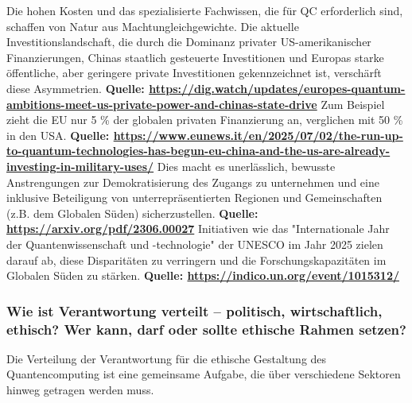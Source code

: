 Die hohen Kosten und das spezialisierte Fachwissen, die für QC erforderlich sind, schaffen von Natur aus Machtungleichgewichte. Die aktuelle Investitionslandschaft, die durch die Dominanz privater US-amerikanischer Finanzierungen, Chinas staatlich gesteuerte Investitionen und Europas starke öffentliche, aber geringere private Investitionen gekennzeichnet ist, verschärft diese Asymmetrien. \textbf{Quelle: \href{https://dig.watch/updates/europes-quantum-ambitions-meet-us-private-power-and-chinas-state-drive}{https://dig.watch/updates/europes-quantum-ambitions-meet-us-private-power-and-chinas-state-drive}} Zum Beispiel zieht die EU nur 5 \% der globalen privaten Finanzierung an, verglichen mit 50 \% in den USA. \textbf{Quelle: \href{https://www.eunews.it/en/2025/07/02/the-run-up-to-quantum-technologies-has-begun-eu-china-and-the-us-are-already-investing-in-military-uses/}{https://www.eunews.it/en/2025/07/02/the-run-up-to-quantum-technologies-has-begun-eu-china-and-the-us-are-already-investing-in-military-uses/}} Dies macht es unerlässlich, bewusste Anstrengungen zur Demokratisierung des Zugangs zu unternehmen und eine inklusive Beteiligung von unterrepräsentierten Regionen und Gemeinschaften (z.B. dem Globalen Süden) sicherzustellen. \textbf{Quelle: \href{https://arxiv.org/pdf/2306.00027}{https://arxiv.org/pdf/2306.00027}} Initiativen wie das "Internationale Jahr der Quantenwissenschaft und -technologie" der UNESCO im Jahr 2025 zielen darauf ab, diese Disparitäten zu verringern und die Forschungskapazitäten im Globalen Süden zu stärken. \textbf{Quelle: \href{https://indico.un.org/event/1015312/}{https://indico.un.org/event/1015312/}}


\subsubsection{Wie ist Verantwortung verteilt – politisch, wirtschaftlich, ethisch? Wer kann, darf oder sollte ethische Rahmen setzen?}
Die Verteilung der Verantwortung für die ethische Gestaltung des Quantencomputing ist eine gemeinsame Aufgabe, die über verschiedene Sektoren hinweg getragen werden muss.

